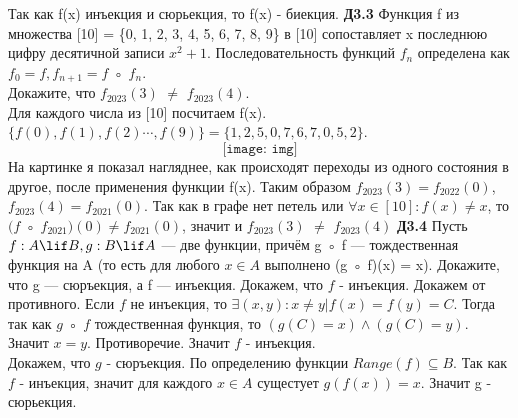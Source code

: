 \documentclass[12pt, a4paper]{article}
\begin{document}
	Так как f(x) инъекция и сюрьекция, то f(x) - биекция.
	\bspace
	\textbf{Д3.3} Функция f из множества [10] = \{0, 1, 2, 3, 4, 5, 6, 7, 8, 9\} в [10] сопоставляет x последнюю цифру
	десятичной записи $x^2 + 1$. Последовательность функций $f_n$ определена как $f_0 = f, f_{n+1} = f$ ◦ $f_n$. \\
	Докажите, что $f_{2023}(3)$ $\neq$ $f_{2023}(4)$.\\
	Для каждого числа из [10] посчитаем f(x). \\
	$\{f(0), f(1), f(2) \cdots, f(9)\} = \{1, 2, 5, 0, 7, 6, 7, 0, 5, 2\}$.\bspace
	\[\texttt{[image: img]}\]
	\bspace
	На картинке я показал нагляднее, как происходят переходы из одного состояния в другое, после применения функции f(x). Таким образом $f_{2023}(3) = f_{2022}(0)$, $f_{2023}(4) = f_{2021}(0)$. Так как в графе нет петель или $\forall x \in [10]: f(x) \neq x$, то $(f $ ◦ $f_{2021})(0) \neq f_{2021}(0)$, значит и  $f_{2023}(3)$ $\neq$ $f_{2023}(4)$
	\bspace
	\textbf{Д3.4}
	Пусть $f : A \lif B, g : B \lif A$ — две функции, причём g ◦ f — тождественная функция на A (то есть
	для любого $x \in A$ выполнено (g ◦ f)(x) = x). Докажите, что g — сюръекция, а f — инъекция.
	\bspace
	Докажем, что $f$ - инъекция. Докажем от противного. Если $f$ не инъекция, то $\exists (x, y): x \neq y | f(x) = f(y) = C$. Тогда так как $g$ ◦ $f$ тождественная функция, то $(g(C) = x) \land (g(C) = y)$. Значит $x = y$. Противоречие. Значит $f$ - инъекция. \\
	Докажем, что $g$ - сюръекция. По определению функции $Range(f) \subseteq B$. Так как $f$ - инъекция, значит для каждого $x \in A$ сущестует $g(f(x)) = x$. Значит g - сюрьекция.
	
\end{document}
